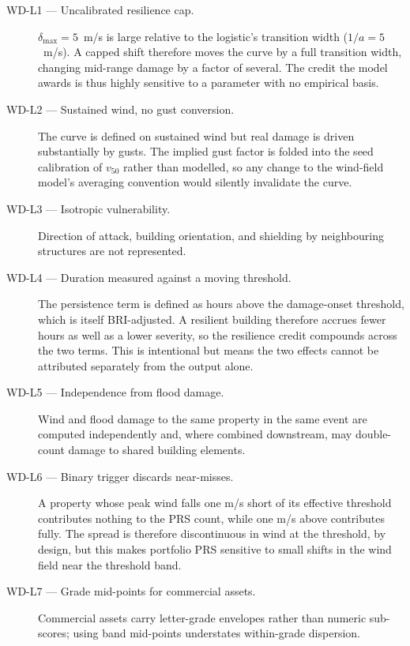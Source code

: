 \documentclass[11pt,a4paper]{article}
\begin{document}
\begin{description}
  \item[WD-L1 --- Uncalibrated resilience cap.] $\delta_{\max} = 5$~m/s is large
        relative to the logistic's transition width ($1/a = 5$~m/s). A capped
        shift therefore moves the curve by a full transition width, changing
        mid-range damage by a factor of several. The credit the model awards is
        thus highly sensitive to a parameter with no empirical basis.
  \item[WD-L2 --- Sustained wind, no gust conversion.] The curve is defined on
        sustained wind but real damage is driven substantially by gusts. The
        implied gust factor is folded into the seed calibration of $v_{50}$
        rather than modelled, so any change to the wind-field model's averaging
        convention would silently invalidate the curve.
  \item[WD-L3 --- Isotropic vulnerability.] Direction of attack, building
        orientation, and shielding by neighbouring structures are not
        represented.
  \item[WD-L4 --- Duration measured against a moving threshold.] The persistence
        term is defined as hours above the damage-onset threshold, which is
        itself BRI-adjusted. A resilient building therefore accrues fewer hours
        as well as a lower severity, so the resilience credit compounds across
        the two terms. This is intentional but means the two effects cannot be
        attributed separately from the output alone.
  \item[WD-L5 --- Independence from flood damage.] Wind and flood damage to the
        same property in the same event are computed independently and, where
        combined downstream, may double-count damage to shared building
        elements.
  \item[WD-L6 --- Binary trigger discards near-misses.] A property whose peak
        wind falls one m/s short of its effective threshold contributes nothing
        to the PRS count, while one m/s above contributes fully. The spread is
        therefore discontinuous in wind at the threshold, by design, but this
        makes portfolio PRS sensitive to small shifts in the wind field near the
        threshold band.
  \item[WD-L7 --- Grade mid-points for commercial assets.] Commercial assets
        carry letter-grade envelopes rather than numeric sub-scores; using band
        mid-points understates within-grade dispersion.
\end{description}
\end{document}
